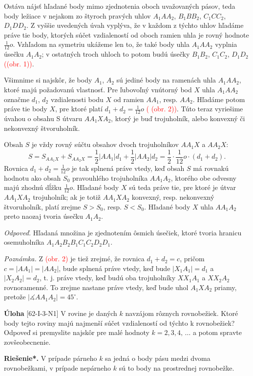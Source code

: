 \documentclass{article}
\newcommand{\rieh}{\textbf{Riešenie*.} }
\newcommand{\ma}{\measuredangle}
\newcommand\todo[1]{\noindent\textcolor{red}{(#1)}}
\newcommand{\problem}[4]{
  \begin{tcolorbox}[breakable,notitle,boxrule=0pt,colback=light-gray,colframe=light-gray]
    \textbf{Úloha}
    [#1] #3
  \end{tcolorbox}
  \noindent#4
}
\begin{document}
{\begin{enumerate}[(1)]
\end{enumerate}
Ostáva nájsť hľadané body mimo zjednotenia oboch uvažovaných pásov, teda body ležiace v nejakom zo štyroch
pravých uhlov $A_1 AA_2$, $B_1 BB_2$, $C_1 CC_2$, $D_1 DD_2$. Z vyššie uvedených úvah vyplýva, že v každom z týchto uhlov hľadáme práve tie body, ktorých súčet vzdialeností od oboch ramien uhla je rovný hodnote $\frac{1}{12}o$. Vzhľadom na symetriu ukážeme len to, že také body uhla $A_1 AA_2$ vyplnia úsečku $A_1 A_2$; v ostatných troch uhloch to potom budú úsečky $B_1 B_2$, $C_1 C_2$, $D_1 D_2$ \todo{(obr. 1)}.

Všimnime si najskôr, že body $A_1$, $A_2$ sú jediné body na ramenách uhla $A_1 AA_2$, ktoré majú požadovanú vlastnosť. Pre ľubovoľný vnútorný bod $X$ uhla $A_1 AA_2$ označme $d_1$, $d_2$ vzdialenosti bodu $X$ od ramien $AA_1$, resp. $AA_2$. Hľadáme potom práve tie body $X$, pre ktoré platí $d_1 +d_2 =\frac{1}{12}o$ \todo{ (obr. 2)}. Túto  teraz vyriešime úvahou o obsahu S útvaru $AA_1 XA_2$, ktorý je buď trojuholník, alebo konvexný či nekonvexný štvoruholník.

Obsah $S$ je vždy rovný súčtu obsahov dvoch trojuholníkov $AA_1 X$ a $AA_2 X$:
$$S = S_{AA_1 X} + S_{AA_2 X} =\frac{1}{2}|AA_1 |d_1 + \frac{1}{2}|AA_2 |d_2 = \frac{1}{2} \cdot \frac{1}{12}o \cdot (d_1 + d_2 ).$$
Rovnica $d_1 +d_2 =\frac{1}{12}o$ je tak splnená práve vtedy, keď obsah $S$ má rovnakú hodnotu ako obsah $S_0$ pravouhlého trojuholníka $AA_1 A_2$, ktorého obe odvesny majú zhodnú dĺžku $\frac{1}{12}o$. Hľadané body $X$ sú teda práve tie, pre ktoré je útvar $AA_1 XA_2$ trojuholník; ak je totiž $AA_1 XA_2$ konvexný, resp. nekonvexný štvoruholník, platí zrejme $S > S_0$, resp. $S < S_0$. Hľadané body $X$ uhla $AA_1 A_2$ preto naozaj tvoria úsečku $A_1 A_2$.

\textit{Odpoveď.} Hľadaná množina je zjednotením ôsmich úsečiek, ktoré tvoria hranicu osemuholníka $A_1 A_2 B_2 B_1 C_1 C_2 D_2 D_1$.

\textit{Poznámka.} Z \todo{obr. 2} je tiež zrejmé, že rovnica $d_1 + d_2 = c$, pričom $c = |AA_1 | = |AA_2|$, bude splnená práve vtedy, keď bude $|X_1 A_1 | = d_1$ a $|X_2 A_2| = d_2$, t. j. práve vtedy, keď budú oba trojuholníky $XX_1 A_1$ a $XX_2 A_2$ rovnoramenné. To zrejme nastane práve vtedy, keď bude uhol $A_1 XA_2$ priamy, pretože $|\ma AA_1 A_2 | = 45^\circ$.
}


\problem{62-I-3-N1}{}{
V rovine je daných $k$ navzájom rôznych rovnobežiek. Ktoré body tejto roviny majú najmenší súčet vzdialeností od týchto k rovnobežiek? Odpoveď si premyslite najskôr pre malé hodnoty $k = 2, 3, 4,\,\ldots$ a potom spravte zovšeobecnenie.
}{
\rieh V prípade párneho $k$ sa jedná o body pásu medzi dvoma \uv{prostrednými} rovnobežkami, v prípade nepárneho $k$ sú to body na prostrednej rovnobežke.
}
\end{document}
